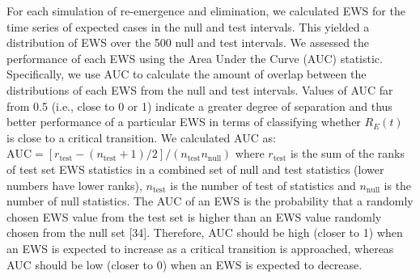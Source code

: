 \documentclass[3p]{elsarticle} %
\begin{document}
For each simulation of re-emergence and elimination, we calculated EWS
for the time series of expected cases in the null and test intervals.
This yielded a distribution of EWS over the 500 null and test intervals.
We assessed the performance of each EWS using the Area Under the Curve
(AUC) statistic. Specifically, we use AUC to calculate the amount of
overlap between the distributions of each EWS from the null and test
intervals. Values of AUC far from 0.5 (i.e., close to 0 or 1) indicate a
greater degree of separation and thus better performance of a particular
EWS in terms of classifying whether \(R_E(t)\) is close to a critical
transition. We calculated AUC as:
\(\text{AUC} = \left[r_{\text{test}} - \left(n_{\text{test}}+1\right)/2\right] / \left(n_{\text{test}}n_{\text{null}}\right)\)
where \(r_{\text{test}}\) is the sum of the ranks of test set EWS
statistics in a combined set of null and test statistics (lower numbers
have lower ranks), \(n_{\text{test}}\) is the number of test of
statistics and \(n_{\text{null}}\) is the number of null statistics. The
AUC of an EWS is the probability that a randomly chosen EWS value from
the test set is higher than an EWS value randomly chosen from the null
set {[}34{]}. Therefore, AUC should be high (closer to 1) when an EWS is
expected to increase as a critical transition is approached, whereas AUC
should be low (closer to 0) when an EWS is expected to decrease.
\end{document}
